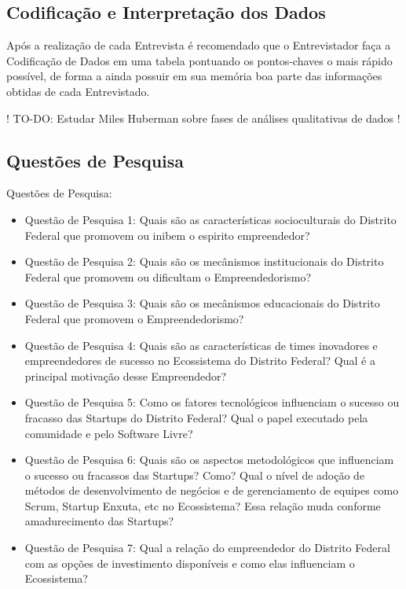 \subsection{Codificação e Interpretação dos Dados}
\label{subsection:codificacao_e_interpretacao_dos_dados}

Após a realização de cada Entrevista é recomendado que o Entrevistador faça a Codificação de Dados em uma tabela pontuando os pontos-chaves o mais rápido possível, de forma a ainda possuir em sua memória boa parte das informações obtidas de cada Entrevistado.

! TO-DO: Estudar Miles Huberman sobre fases de análises qualitativas de dados !

\subsection{Questões de Pesquisa}
\label{subsection:questoes_de_pesquisa}

Questões de Pesquisa:
\begin{itemize}
  \item Questão de Pesquisa 1: Quais são as características socioculturais do Distrito Federal que promovem ou inibem o espirito empreendedor?
  \item Questão de Pesquisa 2: Quais são os mecânismos institucionais do Distrito Federal que promovem ou dificultam o Empreendedorismo?
  \item Questão de Pesquisa 3: Quais são os mecânismos educacionais do Distrito Federal que promovem o Empreendedorismo?
  \item Questão de Pesquisa 4: Quais são as características de times inovadores e empreendedores de sucesso no Ecossistema do Distrito Federal? Qual é a principal motivação desse Empreendedor?
  \item Questão de Pesquisa 5: Como os fatores tecnológicos influenciam o sucesso ou fracasso das Startups do Distrito Federal? Qual o papel executado pela comunidade e pelo Software Livre?
  \item Questão de Pesquisa 6: Quais são os aspectos metodológicos que influenciam o sucesso ou fracassos das Startups? Como? Qual o nível de adoção de métodos de desenvolvimento de negócios
  e de gerenciamento de equipes como Scrum, Startup Enxuta, etc no Ecossistema? Essa relação muda conforme amadurecimento das Startups?
  \item Questão de Pesquisa 7: Qual a relação do empreendedor do Distrito Federal com as opções de investimento disponíveis e como elas influenciam o Ecossistema?
\end{itemize}

